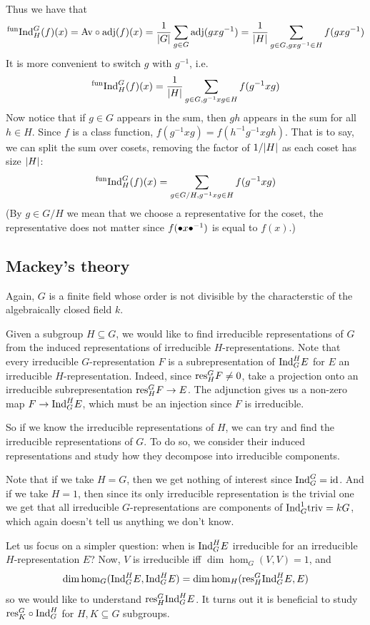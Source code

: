 Thus we have that
$$ {}^{\rm fun}{\rm Ind}^G_H(f)(x) = {\rm Av}\circ{\rm adj}(f)(x) = {{1}\over{\mathopen{}\mathclose{\left|G\right|}}}\sum_{g\in G}{\rm adj}(gxg^{-1}) = {{1}\over{\mathopen{}\mathclose{\left|H\right|}}}\sum_{g\in G,gxg^{-1}\in H}f(gxg^{-1}) $$
It is more convenient to switch $g$ with $g^{-1}$, i.e.\
$$ {}^{\rm fun}{\rm Ind}^G_H(f)(x) = {{1}\over{\mathopen{}\mathclose{\left|H\right|}}}\sum_{g\in G,g^{-1}xg\in H}f(g^{-1}xg) $$
Now notice that if $g\in G$ appears in the sum, then $gh$ appears in the sum for all $h\in H$.
Since $f$ is a class function, $f(g^{-1}xg)=f(h^{-1}g^{-1}xgh)$.
That is to say, we can split the sum over cosets, removing the factor of $1/\mathopen{}\mathclose{\left|H\right|}$ as each coset has size $\mathopen{}\mathclose{\left|H\right|}$:
$$ {}^{\rm fun}{\rm Ind}^G_H(f)(x) = \sum_{g\in G/H,g^{-1}xg\in H}f(g^{-1}xg) $$
(By $g\in G/H$ we mean that we choose a representative for the coset, the representative does not matter since $f(\bullet x\bullet^{-1})$ is equal to $f(x)$.)

\subsection{Mackey's theory}

Again, $G$ is a finite field whose order is not divisible by the characterstic of the algebraically closed field $k$.

Given a subgroup $H\subseteq G$, we would like to find irreducible representations of $G$ from the induced representations of irreducible $H$-representations.
Note that every irreducible $G$-representation $F$ is a subrepresentation of ${\rm Ind}^H_GE$ for $E$ an irreducible $H$-representation.
Indeed, since ${\rm res}^G_HF\neq0$, take a projection onto an irreducible subrepresentation ${\rm res}^G_HF\to E$.
The adjunction gives us a non-zero map $F\to{\rm Ind}^H_GE$, which must be an injection since $F$ is irreducible.

So if we know the irreducible representations of $H$, we can try and find the irreducible representations of $G$.
To do so, we consider their induced representations and study how they decompose into irreducible components.

Note that if we take $H=G$, then we get nothing of interest since ${\rm Ind}^G_G={\rm id}$.
And if we take $H=1$, then since its only irreducible representation is the trivial one we get that all irreducible $G$-representations are components of
${\rm Ind}^1_G{\rm triv}=kG$, which again doesn't tell us anything we don't know.

Let us focus on a simpler question: when is ${\rm Ind}^H_GE$ irreducible for an irreducible $H$-representation $E$?
Now, $V$ is irreducible iff $\dim\hom_G(V,V)=1$, and
$$ \dim\hom_G({\rm Ind}^H_GE,{\rm Ind}^H_GE) = \dim\hom_H({\rm res}^G_H{\rm Ind}^H_GE,E) $$
so we would like to understand ${\rm res}^G_H{\rm Ind}^H_GE$.
It turns out it is beneficial to study ${\rm res}^G_K\circ{\rm Ind}^H_G$ for $H,K\subseteq G$ subgroups.

